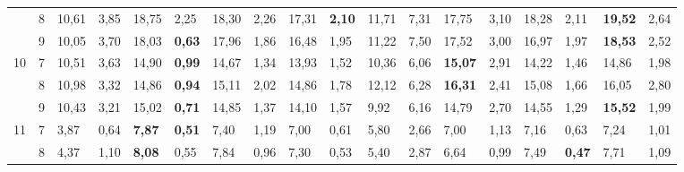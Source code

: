 \documentclass[conference]{IEEEtran}
\begin{document}
\begin{table}[]
\begin{tabular}{|cl|ll|ll|ll|ll|ll|ll|ll|ll|}
		\multicolumn{1}{|c|}{} & 8 & \multicolumn{1}{l|}{10,61} & 3,85 & \multicolumn{1}{l|}{18,75} & 2,25 & \multicolumn{1}{l|}{18,30} & 2,26 & \multicolumn{1}{l|}{17,31} & \textbf{2,10} & \multicolumn{1}{l|}{11,71} & 7,31 & \multicolumn{1}{l|}{17,75} & 3,10 & \multicolumn{1}{l|}{18,28} & 2,11 & \multicolumn{1}{l|}{\textbf{19,52}} & 2,64 \\ \cline{2-18} 
		\multicolumn{1}{|c|}{} & 9 & \multicolumn{1}{l|}{10,05} & 3,70 & \multicolumn{1}{l|}{18,03} & \textbf{0,63} & \multicolumn{1}{l|}{17,96} & 1,86 & \multicolumn{1}{l|}{16,48} & 1,95 & \multicolumn{1}{l|}{11,22} & 7,50 & \multicolumn{1}{l|}{17,52} & 3,00 & \multicolumn{1}{l|}{16,97} & 1,97 & \multicolumn{1}{l|}{\textbf{18,53}} & 2,52 \\ \hline
		\multicolumn{1}{|c|}{\multirow{3}{*}{10}} & 7 & \multicolumn{1}{l|}{10,51} & 3,63 & \multicolumn{1}{l|}{14,90} & \textbf{0,99} & \multicolumn{1}{l|}{14,67} & 1,34 & \multicolumn{1}{l|}{13,93} & 1,52 & \multicolumn{1}{l|}{10,36} & 6,06 & \multicolumn{1}{l|}{\textbf{15,07}} & 2,91 & \multicolumn{1}{l|}{14,22} & 1,46 & \multicolumn{1}{l|}{14,86} & 1,98 \\ \cline{2-18} 
		\multicolumn{1}{|c|}{} & 8 & \multicolumn{1}{l|}{10,98} & 3,32 & \multicolumn{1}{l|}{14,86} & \textbf{0,94} & \multicolumn{1}{l|}{15,11} & 2,02 & \multicolumn{1}{l|}{14,86} & 1,78 & \multicolumn{1}{l|}{12,12} & 6,28 & \multicolumn{1}{l|}{\textbf{16,31}} & 2,41 & \multicolumn{1}{l|}{15,08} & 1,66 & \multicolumn{1}{l|}{16,05} & 2,80 \\ \cline{2-18} 
		\multicolumn{1}{|c|}{} & 9 & \multicolumn{1}{l|}{10,43} & 3,21 & \multicolumn{1}{l|}{15,02} & \textbf{0,71} & \multicolumn{1}{l|}{14,85} & 1,37 & \multicolumn{1}{l|}{14,10} & 1,57 & \multicolumn{1}{l|}{9,92} & 6,16 & \multicolumn{1}{l|}{14,79} & 2,70 & \multicolumn{1}{l|}{14,55} & 1,29 & \multicolumn{1}{l|}{\textbf{15,52}} & 1,99 \\ \hline
		\multicolumn{1}{|c|}{\multirow{3}{*}{11}} & 7 & \multicolumn{1}{l|}{3,87} & 0,64 & \multicolumn{1}{l|}{\textbf{7,87}} & \textbf{0,51} & \multicolumn{1}{l|}{7,40} & 1,19 & \multicolumn{1}{l|}{7,00} & 0,61 & \multicolumn{1}{l|}{5,80} & 2,66 & \multicolumn{1}{l|}{7,00} & 1,13 & \multicolumn{1}{l|}{7,16} & 0,63 & \multicolumn{1}{l|}{7,24} & 1,01 \\ \cline{2-18} 
		\multicolumn{1}{|c|}{} & 8 & \multicolumn{1}{l|}{4,37} & 1,10 & \multicolumn{1}{l|}{\textbf{8,08}} & 0,55 & \multicolumn{1}{l|}{7,84} & 0,96 & \multicolumn{1}{l|}{7,30} & 0,53 & \multicolumn{1}{l|}{5,40} & 2,87 & \multicolumn{1}{l|}{6,64} & 0,99 & \multicolumn{1}{l|}{7,49} & \textbf{0,47} & \multicolumn{1}{l|}{7,71} & 1,09 \\ \cline{2-18} 

\end{tabular}
\end{table}
\end{document}
